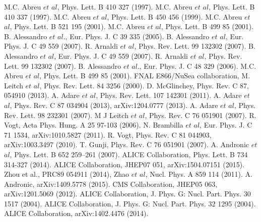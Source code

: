 \begin{thebibliography}{4}
 M.C. Abreu $et$ $al$, Phys. Lett. B 410 327 (1997).
 M.C. Abreu $et$ $al$, Phys. Lett. B 410 337 (1997).
 M.C. Abreu $et$ $al$, Phys. Lett. B 450 456 (1999).
 M.C. Abreu $et$ $al$, Phys. Lett. B 521 195 (2001).
 M.C. Abreu $et$ $al$, Phys. Lett. B 499 85 (2001).
 B. Alessandro $et$ $al$., Eur. Phys. J. C 39 335 (2005).
 B. Alessandro $et$ $al$, Eur. Phys. J. C 49 559 (2007).
 R. Arnaldi $et$ $al$, Phys. Rev. Lett. 99 132302 (2007).
 B. Alessandro $et$ $al$, Eur. Phys. J. C 49 559 (2007).
 R. Arnaldi $et$ $al$, Phys. Rev. Lett. 99 132302 (2007).
 B. Alessandro $et$ $al$., Eur. Phys. J. C 48 329 (2006).
 M.C. Abreu $et$ $al$, Phys. Lett. B 499 85 (2001).
 FNAL E866/NuSea collaboration, M. Leitch $et$ $al$,  Phys. Rev. Lett. 84 3256 (2000).
 D. McGlinchey, Phys. Rev. C 87, 054910 (2013).
 A. Adare $et$ $al$, Phys. Rev. Lett. 107 142301 (2011). 
 A. Adare $et$ $al$, Phys. Rev. C 87 034904 (2013),  arXiv:1204.0777 (2013).
 A. Adare $et$ $al$, Phys. Rev. Lett. 98 232301 (2007).
 M J Leitch $et$ $al$, Phys. Rev. C 76 051901 (2007).
 R. Vogt, Acta Phys. Hung. A 25 97-103 (2006).
 N. Brambilla $et$ $al$, Eur. Phys. J. C 71 1534, arXiv:1010.5827 (2011).
 R. Vogt, Phys. Rev. C 81 044903, arXiv:1003.3497 (2010).
 T. Gunji, Phys. Rev. C 76 051901 (2007).
 A. Andronic $et$ $al$, Phys. Lett. B 652 259–261 (2007). 
 ALICE Collaboration, Phys. Lett. B 734 314-327 (2014).  
 ALICE Collaboration, JHEP07 051, arXiv:1504.07151 (2015).
 Zhou et al., PRC89 054911 (2014), Zhao $et$ $al$, Nucl. Phys. A 859 114 (2011).
 A. Andronic, arXiv:1409.5778 (2015). 
 CMS Collaboration, JHEP05 063, arXiv:1201.5069 (2012).
 ALICE Collaboration,  J. Phys. G: Nucl. Part. Phys. 30 1517 (2004).
 ALICE Collaboration, J. Phys. G: Nucl. Part. Phys. 32 1295 (2004). 
 ALICE Collaboration, arXiv:1402.4476 (2014).

\end{thebibliography}
